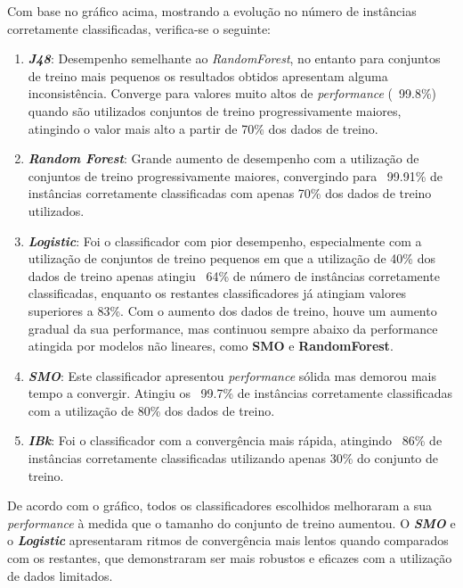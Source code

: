 \documentclass{easychair}
\begin{document}
Com base no gráfico acima, mostrando a evolução no número de instâncias corretamente classificadas, verifica-se o seguinte:

\begin{enumerate}
	\item \textbf{\textit{J48}}: Desempenho semelhante ao \textit{RandomForest}, no entanto para conjuntos de treino mais pequenos os resultados obtidos apresentam alguma inconsistência. Converge para valores muito altos de \textit{performance} (~99.8\%) quando são utilizados conjuntos de treino progressivamente maiores, atingindo o valor mais alto a partir de 70\% dos dados de treino.
	\item \textbf{\textit{Random Forest}}: Grande aumento de desempenho com a utilização de conjuntos de treino progressivamente maiores, convergindo para ~99.91\% de instâncias corretamente classificadas com apenas 70\% dos dados de treino utilizados.
	\item \textbf{\textit{Logistic}}: Foi o classificador com pior desempenho, especialmente com a utilização de conjuntos de treino pequenos em que a utilização de 40\% dos dados de treino apenas atingiu ~64\% de número de instâncias corretamente classificadas, enquanto os restantes classificadores já atingiam valores superiores a 83\%. Com o aumento dos dados de treino, houve um aumento gradual da sua performance, mas continuou sempre abaixo da performance atingida por modelos não lineares, como \textbf{SMO} e \textbf{RandomForest}.
	\item \textbf{\textit{SMO}}: Este classificador apresentou \textit{performance} sólida mas demorou mais tempo a convergir. Atingiu os ~99.7\% de instâncias corretamente classificadas com a utilização de 80\% dos dados de treino.
	\item \textbf{\textit{IBk}}: Foi o classificador com a convergência mais rápida, atingindo ~86\% de instâncias corretamente classificadas utilizando apenas 30\% do conjunto de treino. 
\end{enumerate}

De acordo com o gráfico, todos os classificadores escolhidos melhoraram a sua \textit{performance} à medida que o tamanho do conjunto de treino aumentou. O \textit{\textbf{SMO}} e o \textit{\textbf{Logistic}} apresentaram ritmos de convergência mais lentos quando comparados com os  restantes, que demonstraram ser mais robustos e eficazes com a utilização de dados limitados.

\newpage
\end{document}

